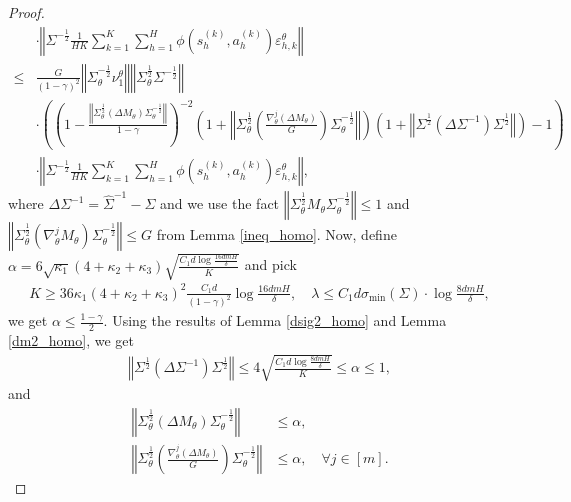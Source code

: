 \documentclass{article}
\numberwithin{equation}{section}
\begin{document}
\begin{proof}
\begin{align*}
    &\cdot\left\Vert\Sigma^{-\frac{1}{2}}\frac{1}{HK}\sum_{k=1}^K\sum_{h=1}^H\phi\left(s_h^{(k)},a_h^{(k)}\right)\varepsilon_{h,k}^\theta\right\Vert\\
    \leq&\frac{G}{(1-\gamma)^2}\left\Vert\Sigma_\theta^{-\frac{1}{2}}\nu^\theta_1\right\Vert\left\Vert\Sigma_\theta^{\frac{1}{2}}\Sigma^{-\frac{1}{2}}\right\Vert\\
    &\cdot\left(\left(1-\frac{\left\Vert\Sigma_\theta^{\frac{1}{2}}\left(\Delta M_\theta\right)\Sigma_\theta^{-\frac{1}{2}}\right\Vert}{1-\gamma}\right)^{-2}\left(1+\left\Vert\Sigma_\theta^{\frac{1}{2}}\left(\frac{\nabla_\theta^j\left(\Delta M_\theta\right)}{G}\right)\Sigma_\theta^{-\frac{1}{2}}\right\Vert\right)\left(1+\left\Vert\Sigma^{\frac{1}{2}}\left(\Delta\Sigma^{-1}\right)\Sigma^{\frac{1}{2}}\right\Vert\right)-1\right)\\
    &\cdot\left\Vert\Sigma^{-\frac{1}{2}}\frac{1}{HK}\sum_{k=1}^K\sum_{h=1}^H\phi\left(s_h^{(k)},a_h^{(k)}\right)\varepsilon_{h,k}^\theta\right\Vert,
\end{align*}
where $\Delta\Sigma^{-1}=\widehat{\Sigma}^{-1}-\Sigma$ and we use the fact $\left\Vert\Sigma_\theta^{\frac{1}{2}}M_\theta\Sigma_\theta^{-\frac{1}{2}}\right\Vert\leq 1$ and $\left\Vert\Sigma_\theta^{\frac{1}{2}}\left(\nabla_\theta^j M_\theta\right)\Sigma_\theta^{-\frac{1}{2}}\right\Vert\leq G$ from Lemma \ref{ineq_homo}. Now, define $\alpha=6\sqrt{\kappa_1}(4+\kappa_2+\kappa_3)\sqrt{\frac{C_1d\log\frac{16dmH}{\delta}}{K}}$ and pick
\begin{align*}
    K\geq 36\kappa_1(4+\kappa_2+\kappa_3)^2\frac{C_1d}{(1-\gamma)^2}\log\frac{16dmH}{\delta},\quad\lambda\leq C_1d\sigma_{\textrm{min}}(\Sigma)\cdot\log\frac{8dmH}{\delta},
\end{align*}
we get $\alpha\leq \frac{1-\gamma}{2}$. Using the results of Lemma \ref{dsig2_homo} and Lemma \ref{dm2_homo}, we get
\begin{align}
    \label{sig_homo}
    \left\Vert\Sigma^{\frac{1}{2}}\left(\Delta\Sigma^{-1}\right)\Sigma^{\frac{1}{2}}\right\Vert\leq 4\sqrt{\frac{C_1d\log\frac{8dmH}{\delta}}{K}}\leq\alpha\leq 1, 
\end{align}
and 
\begin{align}
    \label{dm_homo}
    \left\Vert\Sigma_\theta^{\frac{1}{2}}\left(\Delta M_\theta\right)\Sigma_\theta^{-\frac{1}{2}}\right\Vert&\leq\alpha,\\
    \label{ddm_homo}
    \left\Vert\Sigma_\theta^{\frac{1}{2}}\left(\frac{\nabla_\theta^j\left(\Delta M_\theta\right)}{G}\right)\Sigma_\theta^{-\frac{1}{2}}\right\Vert&\leq\alpha,\quad\forall j\in[m].

\end{align}
\end{proof}
\end{document}
